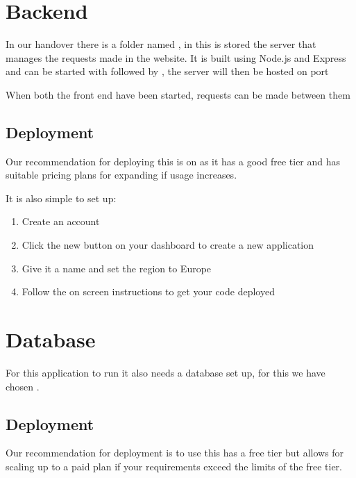 \documentclass[letterpaper,10pt,english]{sphinxmanual}
\let\oldsubsection\subsection
\renewcommand{\subsection}{\needspace{6\baselineskip}\oldsubsection}
\begin{document}
\section{Backend}
\label{\detokenize{docs/Installation/backEnd:backend}}\label{\detokenize{docs/Installation/backEnd::doc}}
In our handover there is a folder named , in this is stored
the server that manages the requests made in the website. It is built
using Node.js and Express and can be started with 
followed by , the server will then be hosted on port

When both the front end have been started, requests can be made between
them


\subsection{Deployment}
\label{\detokenize{docs/Installation/backEnd:deployment}}
Our recommendation for deploying this is on
 as it has a good free tier and has
suitable pricing plans for expanding if usage increases.

It is also simple to set up:
\begin{enumerate}
%
\item {} 
Create an account 

\item {} 
Click the new button on your dashboard to create a new application

\item {} 
Give it a name and set the region to Europe

\item {} 
Follow the on screen instructions to get your code deployed

\end{enumerate}


\section{Database}
\label{\detokenize{docs/Installation/database:database}}\label{\detokenize{docs/Installation/database::doc}}
For this application to run it also needs a database set up, for this we
have chosen .


\subsection{Deployment}
\label{\detokenize{docs/Installation/database:deployment}}
Our recommendation for deployment is to use  this has a free tier but
allows for scaling up to a paid plan if your requirements exceed the
limits of the free tier.
\end{document}
